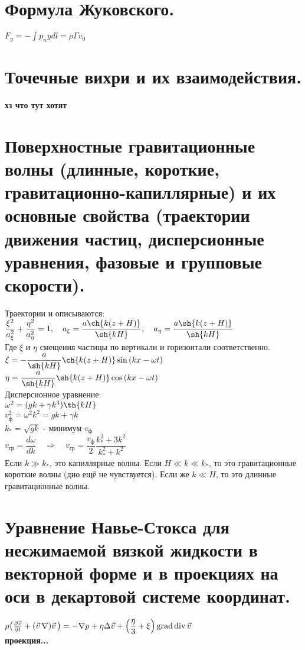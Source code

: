 \begin{multicols*}{3}
		\section{Формула Жуковского.}
		$F_y=-\int p_nydl=\rho\Gamma v_0$
		
		\section{Точечные вихри и их взаимодействия.}
		\textbf{хз что тут хотят}
		
		\section{Поверхностные гравитационные волны (длинные, короткие, гравитационно-капиллярные) и их основные свойства (траектории движения частиц, дисперсионные уравнения, фазовые и групповые скорости).}
		Траектории и описываются: \\
		$\dfrac{\xi^2}{a_\xi^2}+\dfrac{\eta^2}{a_\eta^2} = 1, \quad a_\xi = \dfrac{a\ch{k(z+H)}}{\sh{kH}}	, \quad a_\eta = \dfrac{a\sh{k(z+H)}}{\sh{kH}}$ \\
		Где $\xi$ и $\eta$ смещения частицы по вертикали и горизонтали соответственно. \\
		$ \xi = -\dfrac{a}{\sh{kH}}\ch{k(z+H)}\sin{(kx-\omega t)} $\\
		$ \eta = \dfrac{a}{\sh{kH}}\sh{k(z+H)}\cos{(kx-\omega t)} $\\
		Дисперсионное уравнение: \\
		$ \omega^2 = (gk+\gamma k^3)\th{kH} $ \\
		$ v_\text{ф}^2 = {\omega^2}{k^2} = {g}{k}+\gamma k  $ \\
		$k_{*} = \sqrt{{g}{k}}$ - минимум $v_\text{ф}$\\
		$ v_\text{гр} = \dfrac{d\omega}{dk} \quad \Rightarrow \quad 
		v_\text{гр} = \dfrac{v_\text{ф}}{2}\dfrac{k_{*}^2+3k^2}{k_{*}^2+k^2} $ \\
		Если $k \gg k_*$, это капиллярные волны. 
		Если ${H} \ll k \ll k_*$, то это гравитационные короткие волны (дно ещё не чувствуется).
		Если же $k \ll {H}$, то это длинные гравитационные волны.
		
		\section{Уравнение Навье-Стокса для несжимаемой вязкой жидкости в векторной форме и в проекциях на оси в декартовой системе координат.}
		$\rho\qty(\pdv{\vec{v}}{t}+(\vec{v}\,\nabla)\vec{v}\,) = -\nabla p + \eta \Delta \vec{v} + \qty(\dfrac{\eta}{3}+\xi)\operatorname{grad}\operatorname{div} \vec{v}$ \\
		\textbf{проекция...}
		

\end{multicols*}
